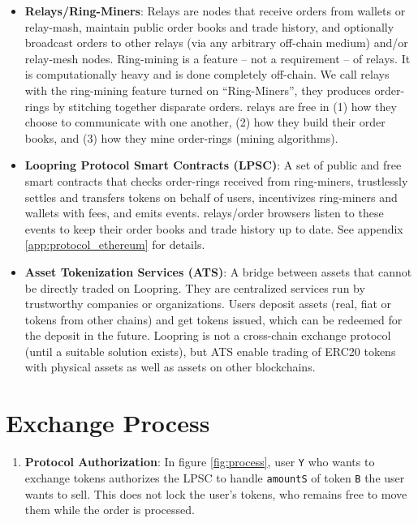 \documentclass[UTF8,nofonts]{article}
\begin{document}
\begin{multicols}{2}
\begin{itemize}
\item \textbf{Relays/Ring-Miners}: Relays are nodes that receive orders from wallets or relay-mash, maintain public order books and trade history, and optionally broadcast orders to other relays (via any arbitrary off-chain medium) and/or relay-mesh nodes. Ring-mining is a feature -- not a requirement -- of relays. It is computationally heavy and is done completely off-chain. We call relays with the ring-mining feature turned on \enquote{Ring-Miners}, they produces order-rings by stitching together disparate orders. relays are free in (1) how they choose to communicate with one another, (2) how they build their order books, and (3) how they mine order-rings (mining algorithms).




\item \textbf{Loopring Protocol Smart Contracts (LPSC)}: A set of public and free smart contracts that checks order-rings received from ring-miners, trustlessly settles and transfers tokens on behalf of users, incentivizes ring-miners and wallets with fees, and emits events. relays/order browsers listen to these events to keep their order books and trade history up to date. See appendix \ref{app:protocol_ethereum} for details.


\item \textbf{Asset Tokenization Services (ATS)}: A bridge between assets that cannot be directly traded on Loopring. They are centralized services run by trustworthy companies or organizations. Users deposit assets (real, fiat or tokens from other chains) and get tokens issued, which can be redeemed for the deposit in the future. Loopring is not a cross-chain exchange protocol (until a suitable solution exists), but ATS enable trading of ERC20 tokens \cite{ERC20} with physical assets as well as assets on other blockchains. 

\end{itemize}


\section{Exchange Process\label{sec:process}}



\begin{enumerate} 


\item \textbf{Protocol Authorization}: In figure \ref{fig:process}, user \verb|Y| who wants to exchange tokens authorizes the LPSC to handle \verb|amountS| of token \verb|B| the user wants to sell. This does not lock the user's tokens, who remains free to move them while the order is processed.


\end{enumerate}
\end{multicols}
\end{document}

